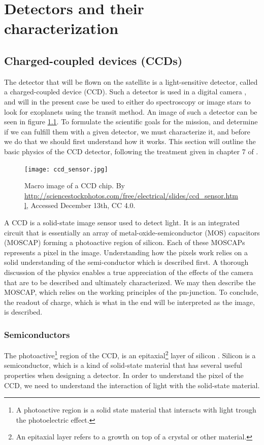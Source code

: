 \documentclass[../main.tex]{subfiles}
\begin{document}
	
	\chapter{Detectors and their characterization}
	\section{Charged-coupled devices (CCDs)}
	The detector that will be flown on the satellite is a light-sensitive detector, called a charged-coupled device (CCD). Such a detector is used in a digital camera \cite{cameraisadetector}, and will in the present case be used to either do spectroscopy or image stars to look for exoplanets using the transit method. An image of such a detector can be seen in figure \ref{fig:CCDchip}. To formulate the scientific goals for the mission, and determine if we can fulfill them with a given detector, we must characterize it, and before we do that we should first understand how it works. This section will outline the basic physics of the CCD detector, following the treatment given in chapter 7 of \cite{solidstatephysicsbook}.
	
	\begin{figure}[h!]
		\centering
		\texttt{[image: ccd\_sensor.jpg]}
		\caption{Macro image of a CCD chip. By  \url{http://sciencestockphotos.com/free/electrical/slides/ccd_sensor.html}, Accessed December 13th, CC 4.0.}
		\label{fig:CCDchip}
	\end{figure}
	
	A CCD is a solid-state image sensor used to detect light. It is an integrated circuit that is essentially an array of metal-oxide-semiconductor (MOS) capacitors (MOSCAP) \cite{IEEMOS} forming a photoactive region of silicon. Each of these MOSCAPs represents a pixel in the image. Understanding how the pixels work relies on a solid understanding of the semi-conductor which is described first. A thorough discussion of the physics enables a true appreciation of the effects of the camera that are to be described and ultimately characterized. We may then describe the MOSCAP, which relies on the working principles of the pn-junction. To conclude, the readout of charge, which is what in the end will be interpreted as the image, is described.
	
	\subsection{Semiconductors}
	The photoactive\footnote{A photoactive region is a solid state material that interacts with light trough the photoelectric effect.} region of the CCD, is an epitaxial\footnote{An epitaxial layer refers to a growth on top of a crystal or other material.} layer of silicon \cite{comphistmus}. Silicon is a semiconductor, which is a kind of solid-state material that has several useful properties when designing a detector. In order to understand the pixel of the CCD, we need to understand the interaction of light with the solid-state material. 
	
\end{document}
